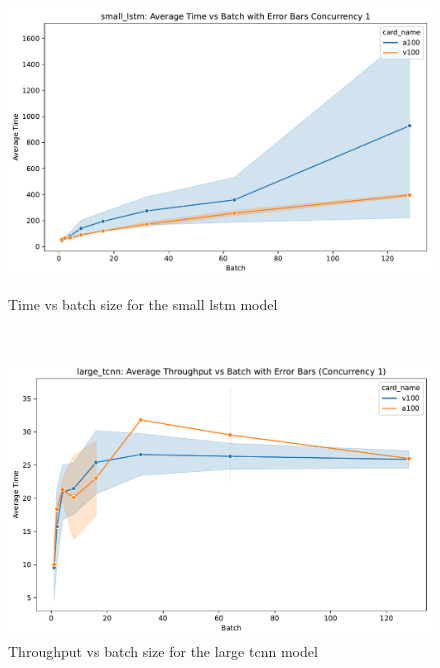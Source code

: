 \documentclass[sigplan,screen,noacm]{acmart}
\begin{document}
\begin{figure}[h]
\begin{minipage}[t]{0.4\textwidth}
  \centering
  \includegraphics[width=1.0\linewidth]{images/time_vs_batch_small_lstm_1.pdf}
  \caption{Time vs batch size for the small lstm model}
    \label{fig:result-4}
\end{minipage}
\ \
\begin{minipage}[t]{0.4\textwidth}
  \centering
  \includegraphics[width=1.0\linewidth]{images/throughput_vs_batch_large_tcnn_1.pdf}
  \caption{Throughput vs batch size for the large tcnn model}
    \label{fig:result-5}


\end{minipage}
\end{figure}
\end{document}
